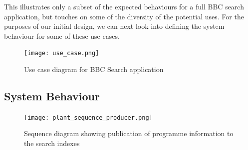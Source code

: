 \documentclass[oribibl]{llncs}
\begin{document}
This illustrates only a subset of the expected behaviours for a full
BBC search application, but touches on some of the diversity of the
potential uses. For the purposes of our initial design, we can next look
into defining the system behaviour for some of these use cases.

\begin{figure}
  \begin{center}
    \texttt{[image: use\_case.png]}
  \end{center}
  \caption{Use case diagram for BBC Search application\label{use-case}}
\end{figure}

\subsection{System Behaviour}

\begin{figure}[t]
  \begin{center}
    \texttt{[image: plant\_sequence\_producer.png]}
  \end{center}
  \caption{Sequence diagram showing publication of programme information to the search indexes\label{sequence-producer}}
\end{figure}
\end{document}
